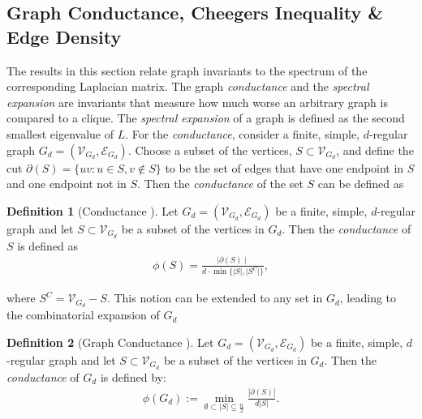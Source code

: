 \documentclass[reqno,8pt]{amsart}
\theoremstyle{definition}
\newtheorem{definition}{Definition}
\theoremstyle{remark}
\numberwithin{equation}{section}
\def\cVGD{\mathcal{V}_{G_d}}
\def\cEGD{\mathcal{E}_{G_d}}
\def\GD{G_d=(\cVGD,\cEGD)}
\begin{document}
\subsection{Graph Conductance, Cheegers Inequality \& Edge Density}
The results in this section relate graph invariants to the spectrum of the corresponding Laplacian matrix. The graph \textit{conductance} and the \textit{spectral expansion} are invariants that measure how much worse an arbitrary graph is compared to a clique. The \textit{spectral expansion} of a graph is defined as the second smallest eigenvalue of $L$. For the \textit{conductance}, consider a finite, simple, $d$-regular graph $\GD$. Choose a subset of the vertices, $S \subset \cVGD$, and define the cut $\partial(S)=\{uv: u\in S, v \not\in S\}$ to be the set of edges that have one endpoint in $S$ and one endpoint not in $S$. Then the \textit{conductance} of the set $S$ can be defined as 
\begin{definition}[Conductance \cite{Spielman2010}]\label{def:edgeexp}
Let $\GD$ be a finite, simple, $d$-regular graph and let $S \subset \cVGD$ be a subset of the vertices in $G_d$. Then the \textit{conductance} of $S$ is defined as
\begin{align}\label{eq:expS} 
\phi(S) = \frac{\mid \partial(S)\mid}{d\cdot \min\{\mid S \mid,\mid S^C\mid\}},
\end{align}
\end{definition}
where $S^C = \cVGD - S$. This notion can be extended to any set in $G_d$, leading to the combinatorial expansion of $G_d$
\begin{definition}[Graph Conductance \cite{Spielman2010}] \label{def:combexp} Let $\GD$ be a finite, simple, $d$-regular graph and let $S \subset \cVGD$ be a subset of the vertices in $G_d$. Then the \textit{conductance} of $G_d$ is defined by: 
\begin{align} \label{eq:expG}
\phi(G_d) := \min_{\emptyset \subset \mid S \mid  \subseteq \frac{n}{2}} \frac{|\partial (S)|}{d |S|}.
\end{align}
\end{definition}
\end{document}
